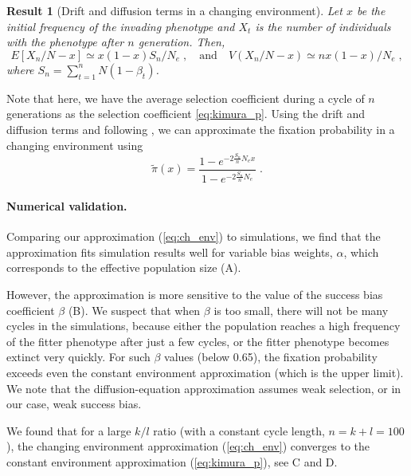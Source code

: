 \documentclass[12pt]{extarticle}
\newtheorem{result}{Result}
\begin{document}
\begin{result} [Drift and diffusion terms in a changing environment]\label{res:ch_expected}
Let $x$ be the initial frequency of the invading phenotype and $X_t$ is the number of individuals with the phenotype after $n$ generation.
Then,
\begin{equation}\label{eq:ch_expected_and_var}
E[X_n/N - x] \simeq x(1-x) S_n / N_e \;, 
\quad
\text{and}
\quad
V(X_n/N-x) \simeq  n x(1-x) / N_e \;,
\end{equation}
where $S_n=\sum\limits_{t=1}^{n} N (1-\beta_t)$.
\end{result}

Note that here, we have the average selection coefficient during a cycle of $n$ generations as the selection coefficient \cref{eq:kimura_p}.
Using the drift and diffusion terms and following \citet{changeEnv}, we can approximate the fixation probability in a changing environment using
\begin{equation}\label{eq:ch_env}
\tilde\pi(x) = \frac{1-e^{-2 \frac{S_n}{n} N_e x}}{1-e^{-2 \frac{S_n}{n} N_e}} \;.
\end{equation}

\paragraph{Numerical validation.}
Comparing our approximation (\cref{eq:ch_env}) to simulations, we find that the approximation fits simulation results well for variable bias weights, $\alpha$, which corresponds to the effective population size (A).

However, the approximation is more sensitive to the value of the success bias coefficient $\beta$ (B).
We suspect that when $\beta$ is too small, there will not be many cycles in the simulations, because either the population reaches a high frequency of the fitter phenotype after just a few cycles, or the fitter phenotype becomes extinct very quickly. 
For such $\beta$ values (below 0.65), the fixation probability exceeds even the constant environment approximation (which is the upper limit). We note that the diffusion-equation approximation assumes weak selection, or in our case, weak success bias.

We found that for a large $k/l$ ratio (with a constant cycle length, $n=k+l=100$), the changing environment approximation (\cref{eq:ch_env}) converges to the constant environment approximation (\cref{eq:kimura_p}), see C and D.
\end{document}
